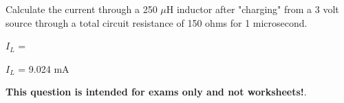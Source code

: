 

Calculate the current through a 250 $\mu$H inductor after "charging" from a 3 volt source through a total circuit resistance of 150 ohms for 1 microsecond.

\vskip 10pt

$I_L$ = 







$I_L$ = 9.024 mA







{\bf This question is intended for exams only and not worksheets!}.



